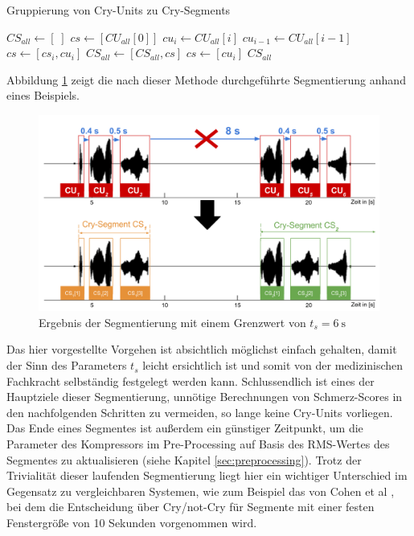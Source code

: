 \begin{algorithm}[H]
	\caption{Gruppierung von Cry-Units zu Cry-Segments}
	\label{alg:crySegment}
	\begin{algorithmic}[1]
		\State $ CS_{all} \gets [\;]$
		\State $ cs \gets [CU_{all}[0]]$
						\State $ cu_i \gets CU_{all}[i]$
						\State $cu_{i-1} \gets CU_{all}[i-1]$
								\State $cs \gets [cs_i , cu_i]$
						\Else
								\State $CS_{all} \gets [CS_{all}, cs]$
								\State $cs \gets [cu_i]$
						\EndIf
				\EndFor
		\Return $CS_{all}$
		
		\EndFunction
		
	\end{algorithmic}
\end{algorithm}
Abbildung \ref{img:segmenting06} zeigt die nach dieser Methode durchgeführte Segmentierung anhand eines Beispiels.

\begin{figure}[h]
	\centering
	\includegraphics[width=1\textwidth]{bilder/segmentierung06.png}
	\caption{Ergebnis der Segmentierung mit einem Grenzwert von $t_s = \SI{6}{\second}$}
	\label{img:segmenting06}
\end{figure}

Das hier vorgestellte Vorgehen ist absichtlich möglichst einfach gehalten, damit der Sinn des Parameters $t_{s}$ leicht ersichtlich ist und somit von der medizinischen Fachkracht selbständig festgelegt werden kann. Schlussendlich ist eines der Hauptziele dieser Segmentierung, unnötige Berechnungen von Schmerz-Scores in den nachfolgenden Schritten zu vermeiden, so lange keine Cry-Units vorliegen. Das Ende eines Segmentes ist außerdem ein günstiger Zeitpunkt, um die Parameter des Kompressors im Pre-Processing auf Basis des RMS-Wertes des Segmentes zu aktualisieren (siehe Kapitel \ref{sec:preprocessing}). Trotz der Trivialität dieser laufenden Segmentierung liegt hier ein wichtiger Unterschied im Gegensatz zu vergleichbaren Systemen, wie zum Beispiel das von Cohen et al \cite{cohenCry}, bei dem die Entscheidung über Cry/not-Cry für Segmente mit einer festen Fenstergröße von 10 Sekunden vorgenommen wird. 

